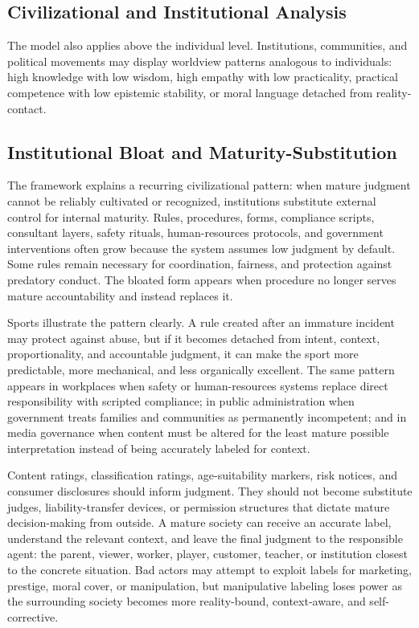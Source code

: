 \documentclass[11pt]{article}
\begin{document}
\subsection{Civilizational and Institutional Analysis}
The model also applies above the individual level. Institutions, communities, and political movements may display worldview patterns analogous to individuals: high knowledge with low wisdom, high empathy with low practicality, practical competence with low epistemic stability, or moral language detached from reality-contact.

\subsection{Institutional Bloat and Maturity-Substitution}
The framework explains a recurring civilizational pattern: when mature judgment cannot be reliably cultivated or recognized, institutions substitute external control for internal maturity. Rules, procedures, forms, compliance scripts, consultant layers, safety rituals, human-resources protocols, and government interventions often grow because the system assumes low judgment by default. Some rules remain necessary for coordination, fairness, and protection against predatory conduct. The bloated form appears when procedure no longer serves mature accountability and instead replaces it.

Sports illustrate the pattern clearly. A rule created after an immature incident may protect against abuse, but if it becomes detached from intent, context, proportionality, and accountable judgment, it can make the sport more predictable, more mechanical, and less organically excellent. The same pattern appears in workplaces when safety or human-resources systems replace direct responsibility with scripted compliance; in public administration when government treats families and communities as permanently incompetent; and in media governance when content must be altered for the least mature possible interpretation instead of being accurately labeled for context.

Content ratings, classification ratings, age-suitability markers, risk notices, and consumer disclosures should inform judgment. They should not become substitute judges, liability-transfer devices, or permission structures that dictate mature decision-making from outside. A mature society can receive an accurate label, understand the relevant context, and leave the final judgment to the responsible agent: the parent, viewer, worker, player, customer, teacher, or institution closest to the concrete situation. Bad actors may attempt to exploit labels for marketing, prestige, moral cover, or manipulation, but manipulative labeling loses power as the surrounding society becomes more reality-bound, context-aware, and self-corrective.
\end{document}
